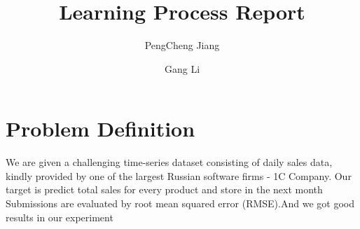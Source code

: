 \documentclass{amsart}
\begin{document}
%
%
\title[Learning Process]{Learning Process Report}%

\author{PengCheng Jiang}
\address[A.~1]{School of Computer Science,\\ 
JiLin University, jilin 130000, China}%

\author{Gang Li}
\address[A.~2]{School of Information Technology \\
Deakin University, Geelong, VIC 3216, Australia}%



%
\date{\gitAuthorDate}%




\maketitle
\tableofcontents

\newpage

\section{Problem Definition}
    We are given a challenging time-series dataset consisting of daily sales data, kindly provided by one of the largest Russian software firms - 1C Company.
    Our target is predict total sales for every product and store in the next month
    Submissions are evaluated by root mean squared error (RMSE).And we got good results in our experiment
\end{document}
